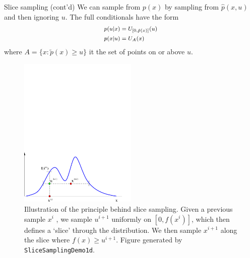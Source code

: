 \documentclass[10pt,mathserif]{beamer}
\begin{document}
\begin{frame}{Slice sampling (cont'd)}
We can sample from $p(x)$ by sampling from $\hat{p}(x, u)$ and then ignoring $u$.  The full conditionals have the form
\begin{equation*} \footnotesize 
    \begin{split}
        p(u|x) & = U_{[0,\tilde{p}(x)]}(u)\\
        p(x|u) & = U_A(x)
    \end{split}
\end{equation*} 
where $A = \{x: \tilde{p}(x)\geq u\}$ it the set of points on or above $u$.

\begin{figure}[h]
\centering
\includegraphics[width=0.5\textwidth]{sliceSampling}
\caption{Illustration of the principle behind slice sampling. Given a previous sample $x^i$ , we sample $u^{i+1}$ uniformly on $[0, f(x^i)]$, which then defines a `slice' through the distribution. We then sample $x^{i+1}$ along the slice where $f(x) \geq u^{i+1}$. Figure generated by \texttt{SliceSamplingDemo1d}.}
\end{figure}
\end{frame}
\end{document}
